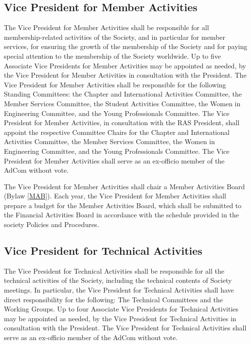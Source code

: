 \documentclass[10pt]{article}
\newcommand{\blref}[1]{Bylaw \ref{#1}}
\begin{document}
\subsection{Vice President for Member Activities}
The Vice President for Member Activities shall be responsible for all membership-related activities of the Society, and in particular for member services, for ensuring the growth of the membership of the Society and for paying special attention to the membership of the Society worldwide. Up to five Associate Vice Presidents for Member Activities may be appointed as needed, by the Vice President for Member Activities in consultation with the President. The Vice President for Member Activities shall be responsible for the following Standing Committees: the Chapter and International Activities Committee,  the Member Services Committee, the Student Activities Committee, the Women in Engineering Committee, and the Young Professionals Committee. The Vice President for Member Activities, in consultation with the RAS President, shall appoint the respective Committee Chairs for the Chapter and International Activities Committee,  the Member Services Committee, the Women in Engineering Committee, and the Young Professionals Committee.  The Vice President for Member Activities shall serve as an ex-officio member of the AdCom without vote. %


The Vice President for Member Activities shall chair a Member Activities Board (\blref{MAB}). Each year, the Vice President for Member Activities shall prepare a budget for the Member Activities Board, which shall be submitted to the Financial Activities Board in accordance with the schedule provided in the society Policies and Procedures.


\subsection{Vice President for Technical Activities}
The Vice President for Technical Activities shall be responsible for all the technical activities of the Society, including the technical contents of Society meetings. In particular, the Vice President for Technical Activities shall have direct responsibility for the following: The Technical Committees and the Working Groups. Up to four Associate Vice Presidents for Technical Activities may be appointed as needed, by the Vice President for Technical Activities in consultation with the President. The Vice President for Technical Activities shall serve as an ex-officio member of the AdCom without vote.
\end{document}
